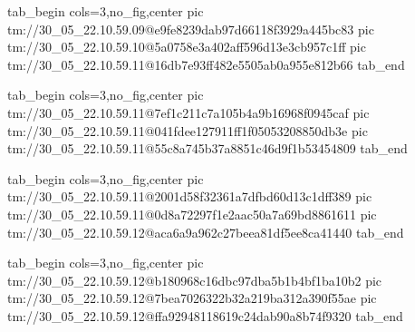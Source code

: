  
 
 
 
 

\qqSecVideo


\ifcmt
  tab_begin cols=3,no_fig,center
    pic tm://30_05_22.10.59.09@e9fe8239dab97d66118f3929a445bc83
    pic tm://30_05_22.10.59.10@5a0758e3a402aff596d13e3cb957c1ff
    pic tm://30_05_22.10.59.11@16db7e93ff482e5505ab0a955e812b66
  tab_end
\fi


\ifcmt
  tab_begin cols=3,no_fig,center
    pic tm://30_05_22.10.59.11@7ef1c211c7a105b4a9b16968f0945caf
    pic tm://30_05_22.10.59.11@041fdee127911ff1f05053208850db3e
    pic tm://30_05_22.10.59.11@55c8a745b37a8851c46d9f1b53454809
  tab_end
\fi


\ifcmt
  tab_begin cols=3,no_fig,center
    pic tm://30_05_22.10.59.11@2001d58f32361a7dfbd60d13c1dff389
    pic tm://30_05_22.10.59.11@0d8a72297f1e2aac50a7a69bd8861611
    pic tm://30_05_22.10.59.12@aca6a9a962c27beea81df5ee8ca41440
  tab_end
\fi


\ifcmt
  tab_begin cols=3,no_fig,center
    pic tm://30_05_22.10.59.12@b180968c16dbc97dba5b1b4bf1ba10b2
    pic tm://30_05_22.10.59.12@7bea7026322b32a219ba312a390f55ae
    pic tm://30_05_22.10.59.12@ffa92948118619c24dab90a8b74f9320
  tab_end
\fi


